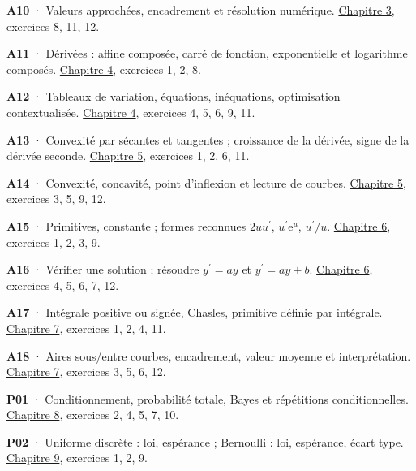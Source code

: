 \noindent\textbf{A10} · Valeurs approchées, encadrement et résolution numérique. \hyperref[chap-3]{Chapitre 3}, exercices 8, 11, 12.\par\vspace{1.6mm}
\noindent\textbf{A11} · Dérivées : affine composée, carré de fonction, exponentielle et logarithme composés. \hyperref[chap-4]{Chapitre 4}, exercices 1, 2, 8.\par\vspace{1.6mm}
\noindent\textbf{A12} · Tableaux de variation, équations, inéquations, optimisation contextualisée. \hyperref[chap-4]{Chapitre 4}, exercices 4, 5, 6, 9, 11.\par\vspace{1.6mm}
\noindent\textbf{A13} · Convexité par sécantes et tangentes ; croissance de la dérivée, signe de la dérivée seconde. \hyperref[chap-5]{Chapitre 5}, exercices 1, 2, 6, 11.\par\vspace{1.6mm}
\noindent\textbf{A14} · Convexité, concavité, point d’inflexion et lecture de courbes. \hyperref[chap-5]{Chapitre 5}, exercices 3, 5, 9, 12.\par\vspace{1.6mm}
\noindent\textbf{A15} · Primitives, constante ; formes reconnues $2uu^{\prime}$, $u^{\prime}\mathrm e^u$, $u^{\prime}/u$. \hyperref[chap-6]{Chapitre 6}, exercices 1, 2, 3, 9.\par\vspace{1.6mm}
\noindent\textbf{A16} · Vérifier une solution ; résoudre $y^{\prime}=ay$ et $y^{\prime}=ay+b$. \hyperref[chap-6]{Chapitre 6}, exercices 4, 5, 6, 7, 12.\par\vspace{1.6mm}
\noindent\textbf{A17} · Intégrale positive ou signée, Chasles, primitive définie par intégrale. \hyperref[chap-7]{Chapitre 7}, exercices 1, 2, 4, 11.\par\vspace{1.6mm}
\noindent\textbf{A18} · Aires sous/entre courbes, encadrement, valeur moyenne et interprétation. \hyperref[chap-7]{Chapitre 7}, exercices 3, 5, 6, 12.\par\vspace{1.6mm}
\noindent\textbf{P01} · Conditionnement, probabilité totale, Bayes et répétitions conditionnelles. \hyperref[chap-8]{Chapitre 8}, exercices 2, 4, 5, 7, 10.\par\vspace{1.6mm}
\noindent\textbf{P02} · Uniforme discrète : loi, espérance ; Bernoulli : loi, espérance, écart type. \hyperref[chap-9]{Chapitre 9}, exercices 1, 2, 9.\par\vspace{1.6mm}
